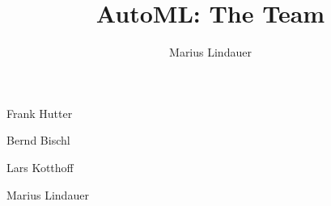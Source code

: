




\title[AutoML: The Team]{AutoML: The Team}
\author{Marius Lindauer}
\date{}





	
	\maketitle
	

\begin{frame}[c]{Frank Hutter}


\end{frame}
\begin{frame}[c]{Bernd Bischl}


\end{frame}
\begin{frame}[c]{Lars Kotthoff}


\end{frame}
\begin{frame}[c]{Marius Lindauer}


\end{frame}



